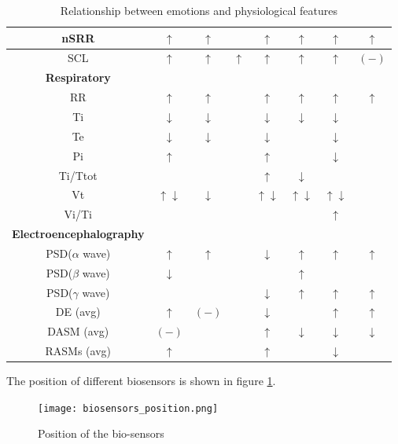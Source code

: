 \begin{table}[h!]
\begin{adjustwidth}{-3cm}{-1cm}
\begin{tabular}{|c|c|c|c|c|c|c|c|}
		\hline nSRR & $\uparrow$ & $\uparrow$ & & $\uparrow$ & $\uparrow$ & $\uparrow$ & $\uparrow$ \\
		\hline SCL & $\uparrow$ & $\uparrow$ & $\uparrow$ & $\uparrow$ & $\uparrow$ & $\uparrow$ & $(-)$ \\
		\hline \hline \textbf{Respiratory} &&&&&&& \\ 
		\hline RR & $\uparrow$ & $\uparrow$ & & $\uparrow$ & $\uparrow$ & $\uparrow$ & $\uparrow$ \\
		\hline Ti & $\downarrow$ & $\downarrow$ & & $\downarrow$ & $\downarrow$ & $\downarrow$ & \\
		\hline Te & $\downarrow$ & $\downarrow$ & & $\downarrow$ & & $\downarrow$ & \\
		\hline Pi & $\uparrow$ & & & $\uparrow$ & & $\downarrow$ & \\
		\hline Ti/Ttot & & & & $\uparrow$ & $\downarrow$ & & \\
		\hline Vt & $\uparrow\downarrow$ & $\downarrow$ & & $\uparrow\downarrow$ & $\uparrow\downarrow$ & $\uparrow\downarrow$ & \\
		\hline Vi/Ti & & & & & & $\uparrow$ & \\
		\hline \hline \textbf{Electroencephalography} &&&&&&& \\ 
		\hline PSD($\alpha$ wave) & $\uparrow$ & $\uparrow$ & & $\downarrow$ & $\uparrow$ & $\uparrow$ &  $\uparrow$ \\
		\hline PSD($\beta$ wave) & $\downarrow$ & & & & $\uparrow$ & & \\
		\hline PSD($\gamma$ wave) & & & & $\downarrow$ & $\uparrow$ & $\uparrow$ & $\uparrow$ \\
		\hline DE (avg) & $\uparrow$ & $(-)$ & & $\downarrow$ & & $\uparrow$ & $\uparrow$ \\
		\hline DASM (avg) & $(-)$ & & & $\uparrow$ & $\downarrow$ & $\downarrow$ & $\downarrow$ \\
		\hline RASMs (avg) & $\uparrow$ & & & $\uparrow$ & & $\downarrow$ & \\
		\hline
	\end{tabular}
	\end{adjustwidth}
	\caption{Relationship between emotions and physiological features}
	\label{table:physiological_features_relation}
\end{table}
\newpage
The position of different biosensors is shown in figure \ref{fig:biosensors_position}.
\begin{figure}[h]
    \centering
    \texttt{[image: biosensors\_position.png]} 
	\caption{Position of the bio-sensors}
    \label{fig:biosensors_position}
\end{figure}


